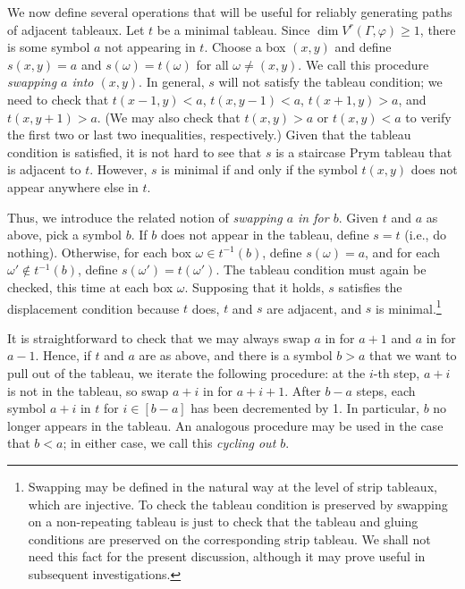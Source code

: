 \documentclass[11pt,reqno]{amsart}
\newcommand{\caelan}[1]{\textcolor{orange}{\sf C: [#1]}}
\newcommand{\steven}[1]{\textcolor{pink}{\sf S: [#1]}}
\theoremstyle{definition}
\theoremstyle{problem}
\theoremstyle{plain}
\theoremstyle{remark}
\theoremstyle{theorem}
\numberwithin{equation}{section}
\numberwithin{figure}{section}
\begin{document}
We now define several operations that will be useful for reliably
generating paths of adjacent tableaux.  Let $t$ be a minimal tableau.
Since $\dim V^r(\Gamma,\varphi) \geq 1$, there is some symbol $a$ not
appearing in $t$.  Choose a box $(x,y)$ and define $s(x,y) = a$ and
$s(\omega) = t(\omega)$ for all $\omega \neq (x,y)$.  We call this
procedure \textit{swapping $a$ into $(x,y)$}.  In general, $s$ will
not satisfy the tableau condition; we need to check that
$t(x-1,y) < a$, $t(x,y-1) < a$, $t(x+1,y) > a$, and $t(x,y+1) > a$.
(We may also check that $t(x,y) > a$ or $t(x,y) < a$ to verify the
first two or last two inequalities, respectively.)  Given that the
tableau condition is satisfied, it is not hard to see that $s$ is a
staircase Prym tableau that is adjacent to $t$.  However, $s$ is
minimal if and only if the symbol $t(x,y)$ does not appear anywhere
else in $t$.

Thus, we introduce the related notion of \textit{swapping $a$ in for
  $b$}.  Given $t$ and $a$ as above, pick a symbol $b$.  If $b$ does
not appear in the tableau, define $s = t$ (i.e., do nothing).
Otherwise, for each box $\omega \in t^{-1}(b)$, define
$s(\omega) = a$, and for each $\omega' \nin t^{-1}(b)$, define
$s(\omega') = t(\omega')$.  The tableau condition must again be
checked, this time at each box $\omega$.  Supposing that it holds, $s$
satisfies the displacement condition because $t$ does, $t$ and $s$ are
adjacent, and $s$ is minimal.\footnote{Swapping may be defined in the
  natural way at the level of strip tableaux, which are injective.  To
  check the tableau condition is preserved by swapping on a
  non-repeating tableau is just to check that the tableau and gluing
  conditions are preserved on the corresponding strip tableau.  We
  shall not need this fact for the present discussion, although it may
  prove useful in subsequent investigations.}

It is straightforward to check that we may always swap $a$ in for
$a+1$ and $a$ in for $a-1$.  Hence, if $t$ and $a$ are as above, and
there is a symbol $b > a$ that we want to pull out of the tableau, we
iterate the following procedure: at the $i$-th step, $a+i$ is not in
the tableau, so swap $a+i$ in for $a+i+1$.  After $b-a$ steps, each
symbol $a+i$ in $t$ for $i \in [b-a]$ has been decremented by 1.  In
particular, $b$ no longer appears in the tableau.  An analogous
procedure may be used in the case that $b < a$; in either case, we
call this \textit{cycling out $b$}. 
\end{document}
